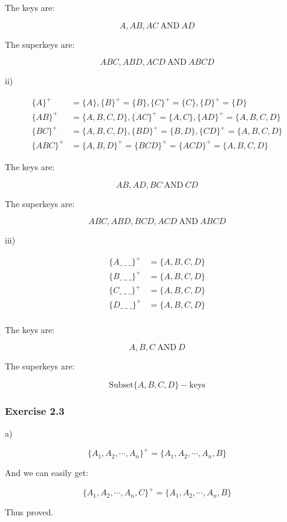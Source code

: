 \documentclass[../../main.tex]{subfiles}
\begin{document}
The keys are:

$$
A, AB, AC \ \mbox{AND} \ AD
$$

The superkeys are:

$$
ABC, ABD, ACD \ \mbox{AND} \ ABCD
$$

ii)

\begin{align*}
  \{A\}^{+} &= \{A\},   \{B\}^{+} = \{B\},
  \{C\}^{+} = \{C\}, \{D\}^{+}= \{D\} \\
  \{AB\}^{+} &= \{A,B,C,D\},  \{AC\}^{+} = \{A,C\},
  \{AD\}^{+} = \{A,B,C,D\} \\
  \{BC\}^{+} &= \{A,B,C,D\}, \{BD\}^{+} = \{B,D\},
  \{CD\}^{+} = \{A,B,C,D\} \\
  \{ABC\}^{+} &= \{A,B,D\}^{+} = \{BCD\}^{+} = \{ACD\}^{+} = \{A,B,C,D\}
\end{align*}

The keys are:

$$
AB, AD, BC \ \mbox{AND} \ CD
$$

The superkeys are:

$$
ABC, ABD, BCD, ACD \ \mbox{AND} \ ABCD
$$


iii)

\begin{align*}
  \{A \_ \ \_ \ \_ \}^{+} &= \{A,B,C,D\} \\
  \{B\_ \ \_ \ \_ \}^{+} &= \{A,B,C,D\} \\
  \{C\_ \ \_ \ \_ \}^{+} &= \{A,B,C,D\} \\
  \{D\_ \ \_ \ \_ \}^{+} &= \{A,B,C,D\} \\
\end{align*}

The keys are:

$$
A, B, C \ \mbox{AND} \ D
$$

The superkeys are:

$$
\mbox{Subset} \{A,B,C,D\} - \mbox{keys}
$$

\subsubsection*{Exercise 2.3}

a)

$$
\{A_{1}, A_{2}, \cdots, A_{n}\} ^ {+} = \{A_{1}, A_{2}, \cdots, A_{n}, B\}
$$

And we can easily get:

$$
\{A_{1}, A_{2}, \cdots, A_{n}, C\} ^ {+} = \{A_{1}, A_{2}, \cdots, A_{n}, B\}
$$

Thus proved.
\end{document}
